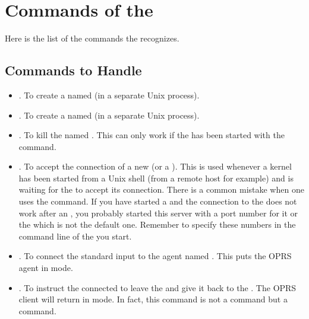 \section{Commands of the \OPRSS{}}

Here is the list of the commands the \OPRSS{} recognizes.



\subsection{\OPRSS{} Commands to Handle \CPK{}}

\begin{itemize}

\item {}. To create a \CPK{} named 
(in a separate Unix process).

\item {}. To create a \XPK{} named 
(in a separate Unix process).

\item {}. To kill the \CPK{} named .
This can only work if the \CPK{} has been started with the
 command.

\item {}. To accept the connection of a new \CPK{} (or a
\XPK{}). This is used whenever a kernel has been started from a Unix
shell (from a remote host for example) and is waiting for the \OPRSS{}
to accept its connection. There is a common mistake when one uses the
 command. If you have started a \CPK{} and the
connection to the \OPRSS{} does not work after an , you
probably started this server with a port number for it or the \MPA{} which is
not the default one. Remember to specify these numbers in the command line of
the \CPK{} you start.

\item {}. To connect the standard input to the \COPRS{}
agent named . This puts the OPRS agent in 
mode.

\item {}. To instruct the connected \COPRS{} to leave the
 and give it back to the \OPRSS{}. The OPRS client will
return in  mode. In fact, this command is not a \OPRSS{} command
but a \CPK{} command.


\end{itemize}
